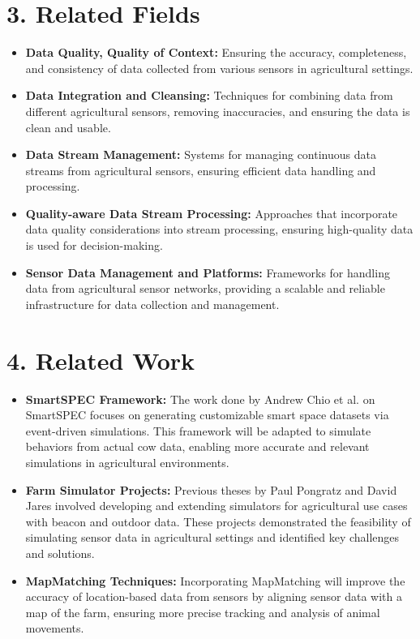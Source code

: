 \documentclass[12pt]{article}
\begin{document}
\section*{3. Related Fields}
\begin{itemize}
    \item \textbf{Data Quality, Quality of Context:} Ensuring the accuracy, completeness, and consistency of data collected from various sensors in agricultural settings.
    \item \textbf{Data Integration and Cleansing:} Techniques for combining data from different agricultural sensors, removing inaccuracies, and ensuring the data is clean and usable.
    \item \textbf{Data Stream Management:} Systems for managing continuous data streams from agricultural sensors, ensuring efficient data handling and processing.
    \item \textbf{Quality-aware Data Stream Processing:} Approaches that incorporate data quality considerations into stream processing, ensuring high-quality data is used for decision-making.
    \item \textbf{Sensor Data Management and Platforms:} Frameworks for handling data from agricultural sensor networks, providing a scalable and reliable infrastructure for data collection and management.
\end{itemize}

\section*{4. Related Work}
\begin{itemize}
    \item \textbf{SmartSPEC Framework:} The work done by Andrew Chio et al. on SmartSPEC focuses on generating customizable smart space datasets via event-driven simulations. This framework will be adapted to simulate behaviors from actual cow data, enabling more accurate and relevant simulations in agricultural environments.
    \item \textbf{Farm Simulator Projects:} Previous theses by Paul Pongratz and David Jares involved developing and extending simulators for agricultural use cases with beacon and outdoor data. These projects demonstrated the feasibility of simulating sensor data in agricultural settings and identified key challenges and solutions.
    \item \textbf{MapMatching Techniques:} Incorporating MapMatching will improve the accuracy of location-based data from sensors by aligning sensor data with a map of the farm, ensuring more precise tracking and analysis of animal movements.
\end{itemize}
\end{document}
